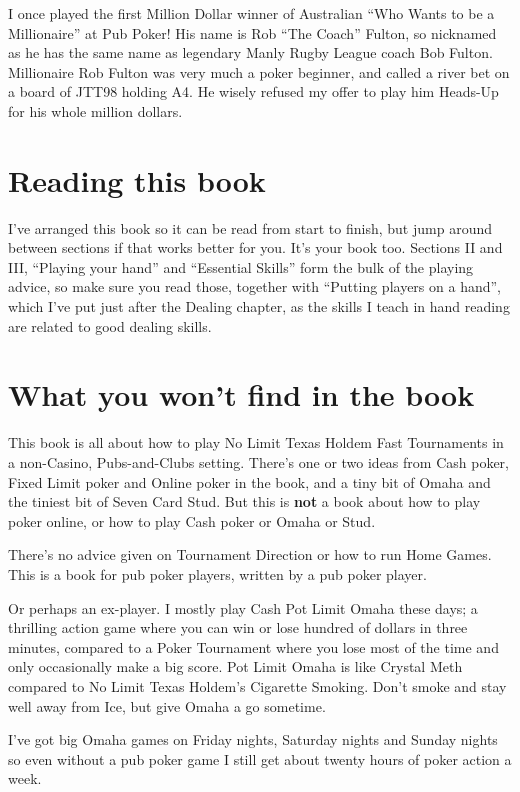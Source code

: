 I once played the first Million Dollar winner of Australian ``Who
Wants to be a Millionaire'' at Pub Poker! His name is Rob ``The
Coach'' Fulton, so nicknamed as he has the same name as legendary
Manly Rugby League coach Bob Fulton. Millionaire Rob Fulton was very
much a poker beginner, and called a river bet on a board of JTT98
holding A4. He wisely refused my offer to play him Heads-Up for his
whole million dollars.

\section{Reading this book}

I've arranged this book so it can be read from start to finish, but jump
around between sections if that works better for you. It's your book too.
Sections II and III, ``Playing your hand'' and ``Essential Skills'' form
the bulk of the playing advice, so make sure you read those, together
with ``Putting players on a hand'', which I've put just after the
Dealing chapter, as the skills I teach in hand reading are related
to good dealing skills.

\section{What you won't find in the book}

This book is all about how to play No Limit Texas Holdem Fast
Tournaments in a non-Casino, Pubs-and-Clubs setting. There's one or
two ideas from Cash poker, Fixed Limit poker and Online poker in the
book, and a tiny bit of Omaha and the tiniest bit of Seven Card Stud.
But this is \textbf{not} a book about how to play poker online, or how
to play Cash poker or Omaha or Stud.

There's no advice given on Tournament Direction or how to run Home
Games. This is a book for pub poker players, written by a pub poker
player.

Or perhaps an ex-player. I mostly play Cash Pot Limit Omaha these days;
a thrilling action game where you can win or lose hundred of dollars
in three minutes, compared to a Poker Tournament where you lose most of
the time and only occasionally make a big score. Pot Limit Omaha
is like Crystal Meth compared to No Limit Texas Holdem's Cigarette
Smoking. Don't smoke and stay well away from Ice, but give Omaha a go
sometime.

I've got big Omaha games on Friday nights, Saturday nights and Sunday
nights so even without a pub poker game I still get about twenty hours
of poker action a week.


